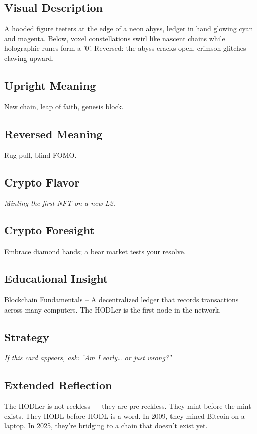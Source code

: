 \documentclass[11pt,oneside]{book}
\begin{document}
\begin{minipage}[t]{0.55\textwidth}
  \vspace{0pt}

  \subsection*{Visual Description}
  A hooded figure teeters at the edge of a neon abyss, ledger in hand glowing cyan and magenta. Below, voxel constellations swirl like nascent chains while holographic runes form a '0'. Reversed: the abyss cracks open, crimson glitches clawing upward.

  \subsection*{Upright Meaning}
  New chain, leap of faith, genesis block.

  \subsection*{Reversed Meaning}
  Rug-pull, blind FOMO.

  \subsection*{Crypto Flavor}
  \textit{Minting the first NFT on a new L2.}

  \subsection*{Crypto Foresight}
  Embrace diamond hands; a bear market tests your resolve.

  \subsection*{Educational Insight}
  Blockchain Fundamentals – A decentralized ledger that records transactions across many computers. The HODLer is the first node in the network.

  \subsection*{Strategy}
  \textit{If this card appears, ask: 'Am I early… or just wrong?'}

  \subsection*{Extended Reflection}
  The HODLer is not reckless — they are pre-reckless. They mint before the mint exists. They HODL before HODL is a word. In 2009, they mined Bitcoin on a laptop. In 2025, they're bridging to a chain that doesn't exist yet.


\end{minipage}
\end{document}
